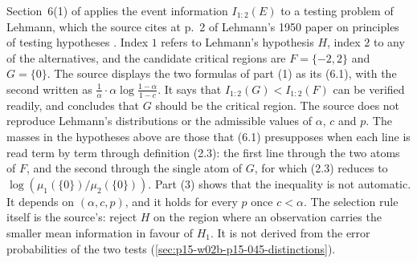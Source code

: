 Section~6(1) of \cite[p.~85]{KullbackLeibler1951Information} applies
the event information \(I_{1:2}(E)\) to a testing problem of Lehmann,
which the source cites at p.~2 of Lehmann's 1950 paper on principles of
testing hypotheses \cite[pp.~85--86]{KullbackLeibler1951Information}.
Index \(1\) refers to Lehmann's hypothesis \(H\), index \(2\) to any of
the alternatives, and the candidate critical regions are \(F=\{-2,2\}\)
and \(G=\{0\}\). The source displays the two formulas of part (1) as its
(6.1), with the second written as \(\frac1\alpha\cdot\alpha\log\frac{1-\alpha}{1-c}\).
It says that \(I_{1:2}(G)<I_{1:2}(F)\) can be verified readily, and
concludes that \(G\) should be the critical region. The source does not
reproduce Lehmann's distributions or the admissible values of
\(\alpha\), \(c\) and \(p\). The masses in the hypotheses above are those
that (6.1) presupposes when each line is read term by term through
definition (2.3): the first line through the two atoms of \(F\), and the
second through the single atom of \(G\), for which (2.3) reduces to
\(\log(\mu_1(\{0\})/\mu_2(\{0\}))\). Part (3) shows that the inequality
is not automatic. It depends on \((\alpha,c,p)\), and it holds for every
\(p\) once \(c<\alpha\). The selection rule itself is the source's:
reject \(H\) on the region where an observation carries the smaller
mean information in favour of \(H_1\). It is not derived from the error
probabilities of the two tests (\cref{sec:p15-w02b-p15-045-distinctions}).

